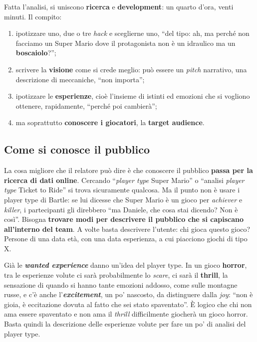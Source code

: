 Fatta l'analisi, si uniscono \textbf{ricerca} e \textbf{development}: un quarto
d'ora, venti minuti. Il compito:
\begin{enumerate}
  \item ipotizzare uno, due o tre \emph{hack} e sceglierne uno, ``del tipo: ah,
        ma perché non facciamo un Super Mario dove il protagonista non è un
        idraulico ma un \textbf{boscaiolo}?'';
  \item scrivere la \textbf{visione} come si crede meglio: può essere un
        \emph{pitch} narrativo, una descrizione di meccaniche, ``non importa'';
  \item ipotizzare le \textbf{esperienze}, cioè l'insieme di istinti ed emozioni
        che si vogliono ottenere, rapidamente, ``perché poi cambierà'';
  \item ma soprattutto \textbf{conoscere i giocatori}, la \textbf{target
        audience}.
\end{enumerate}

\subsection{Come si conosce il pubblico}

La cosa migliore che il relatore può dire è che conoscere il pubblico
\textbf{passa per la ricerca di dati online}. Cercando ``\emph{player type}
Super Mario'' o ``analisi \emph{player type} Ticket to Ride'' si trova
sicuramente qualcosa. Ma il punto non è usare i player type di Bartle: se lui
dicesse che Super Mario è un gioco per \emph{achiever} e \emph{killer}, i
partecipanti gli direbbero ``ma Daniele, che cosa stai dicendo? Non è così''.
Bisogna \textbf{trovare modi per descrivere il pubblico che si capiscano
all'interno del team}. A volte basta descrivere l'utente: chi gioca questo gioco?
Persone di una data età, con una data esperienza, a cui piacciono giochi di tipo
X.

Già le \textbf{\emph{wanted experience}} danno un'idea del player type. In un
gioco \textbf{horror}, tra le esperienze volute ci sarà probabilmente lo
\emph{scare}, ci sarà il \textbf{thrill}, la sensazione di quando si hanno tante
emozioni addosso, come sulle montagne russe, e c'è anche
l'\textbf{\emph{excitement}}, un po' nascosto, da distinguere dalla
\emph{joy}: ``non è gioia, è eccitazione dovuta al fatto che sei stato
spaventato''. È logico che chi non ama essere spaventato e non ama il
\emph{thrill} difficilmente giocherà un gioco horror. Basta quindi la descrizione
delle esperienze volute per fare un po' di analisi del player type.

